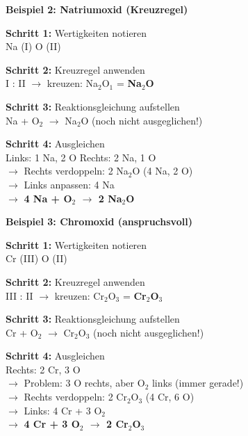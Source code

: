 \documentclass[11pt, a4paper]{article}
\begin{document}
\vspace{0.5em}

\begin{loesungbox}
\textbf{Beispiel 2: Natriumoxid (Kreuzregel)}

\textbf{Schritt 1:} Wertigkeiten notieren\\
Na (I) \quad O (II)

\textbf{Schritt 2:} Kreuzregel anwenden\\
I : II $\rightarrow$ kreuzen: Na$_2$O$_1$ = \textbf{Na$_2$O}

\textbf{Schritt 3:} Reaktionsgleichung aufstellen\\
Na + O$_2$ $\rightarrow$ Na$_2$O \quad (noch nicht ausgeglichen!)

\textbf{Schritt 4:} Ausgleichen\\
Links: 1 Na, 2 O \quad Rechts: 2 Na, 1 O\\
$\rightarrow$ Rechts verdoppeln: 2 Na$_2$O (4 Na, 2 O)\\
$\rightarrow$ Links anpassen: 4 Na\\
$\rightarrow$ \textbf{4 Na + O$_2$ $\rightarrow$ 2 Na$_2$O}
\end{loesungbox}

\vspace{0.5em}

\begin{loesungbox}
\textbf{Beispiel 3: Chromoxid (anspruchsvoll)}

\textbf{Schritt 1:} Wertigkeiten notieren\\
Cr (III) \quad O (II)

\textbf{Schritt 2:} Kreuzregel anwenden\\
III : II $\rightarrow$ kreuzen: Cr$_2$O$_3$ = \textbf{Cr$_2$O$_3$}

\textbf{Schritt 3:} Reaktionsgleichung aufstellen\\
Cr + O$_2$ $\rightarrow$ Cr$_2$O$_3$ \quad (noch nicht ausgeglichen!)

\textbf{Schritt 4:} Ausgleichen\\
Rechts: 2 Cr, 3 O\\
$\rightarrow$ Problem: 3 O rechts, aber O$_2$ links (immer gerade!)\\
$\rightarrow$ Rechts verdoppeln: 2 Cr$_2$O$_3$ (4 Cr, 6 O)\\
$\rightarrow$ Links: 4 Cr + 3 O$_2$\\
$\rightarrow$ \textbf{4 Cr + 3 O$_2$ $\rightarrow$ 2 Cr$_2$O$_3$}
\end{loesungbox}
\end{document}
